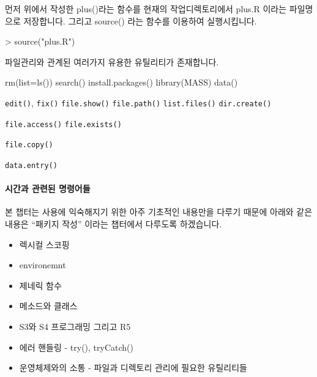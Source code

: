 \documentclass{book}
\begin{document}
먼저 위에서 작성한 plus()라는 함수를 현재의 작업디렉토리에서 plus.R 이라는 파일명으로 저장합니다. 
그리고 source() 라는 함수를 이용하여 실행시킵니다. 
\begin{Schunk}
\begin{Soutput}
> source("plus.R")
\end{Soutput}
\end{Schunk}

파일관리와 관계된 여러가지 유용한 유틸리티가 존재합니다. 
\begin{Schunk}
\begin{Soutput}
rm(list=ls())
search()
install.packages()
library(MASS)
data()
\end{Soutput}
\end{Schunk}

\texttt{edit()},
\texttt{fix()}
\texttt{file.show()}
\texttt{file.path()}
\texttt{list.files()}
\texttt{dir.create()}

\texttt{file.access()}
\texttt{file.exists()}

\texttt{file.copy()}

\texttt{data.entry()}

\paragraph{시간과 관련된 명령어들}



본 챕터는 사용에 익숙해지기 위한 아주 기초적인 내용만을 다루기 때문에 아래와 같은 내용은 ``패키지 작성'' 이라는 챕터에서 다루도록 하겠습니다. 

\begin{itemize}
	\item 렉시컬 스코핑 
	\item environemnt
	\item 제네릭 함수 
	\item 메소드와 클래스 
	\item S3와 S4 프로그래밍 그리고 R5
	\item 에러 핸들링 - try(), tryCatch()
	\item 운영체제와의 소통 - 파일과 디렉토리 관리에 필요한 유틸리티들 
\end{itemize}
	
\end{document}
